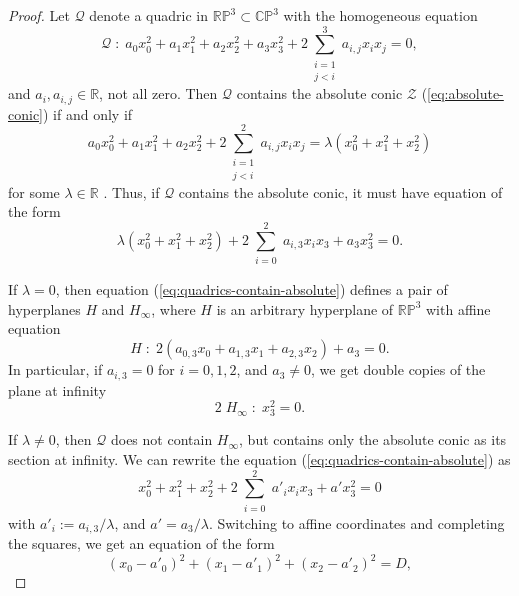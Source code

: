 \documentclass[10pt, a4paper]{article}
\theoremstyle{BoldTopSpacing}
\theoremstyle{BoldTopSpacing}
\theoremstyle{BoldTopSpacing}
\theoremstyle{BoldTopBottomSpacing}
\theoremstyle{BoldTopSpacing}
\theoremstyle{BoldTopBottomSpacing}
\theoremstyle{remark}
\begin{document}
\begin{proof}
Let $\mathcal{Q}$ denote a quadric in $\mathbb{R}\mathbb{P}^3 \subset \mathbb{C}\mathbb{P}^3$ with the homogeneous equation
\begin{equation}
    \mathcal{Q} \; : \; a_{0}x_{0}^2 + a_{1}x_{1}^2 + a_{2}x_{2}^2 + a_{3}x_{3}^2 + 2 \sum_{\substack{i = 1 \\ j < i}}^{3} a_{i, j} x_{i} x_{j} = 0,
\end{equation}
and $a_{i}, a_{i, j} \in \mathbb{R}$, not all zero. Then $\mathcal{Q}$ contains the absolute conic $\mathcal{Z}$ (\ref{eq:absolute-conic}) if and only if
\begin{equation*}
    a_{0}x_{0}^2 + a_{1}x_{1}^2 + a_{2}x_{2}^2 + 2 \sum_{\substack{i = 1 \\ j < i}}^{2} a_{i, j} x_{i} x_{j} = \lambda \left( x_{0}^2 + x_{1}^2 + x_{2}^2 \right)
\end{equation*}
for some $\lambda \in \mathbb{R}$ \cite[\textcolor{CitationColor}{Lemma~6.1.10.}]{alveroAnalyticProjectiveGeometry}. Thus, if $\mathcal{Q}$ contains the absolute conic, it must have equation of the form
\begin{equation}
\label{eq:quadrics-contain-absolute}
   \lambda \left( x_{0}^2 + x_{1}^2 + x_{2}^2 \right) + 2 \sum_{\substack{i = 0}}^{2} a_{i, 3} x_{i} x_{3} + a_{3} x_{3}^2 = 0.
\end{equation}
\par
If $\lambda = 0$, then equation (\ref{eq:quadrics-contain-absolute}) defines a pair of hyperplanes $H$ and $H_{\infty}$, where $H$ is an arbitrary hyperplane of $\mathbb{R}\mathbb{P}^3$ with affine equation
\[
    H \; : \; 2 \left( a_{0, 3} x_{0} + a_{1, 3} x_{1} + a_{2, 3} x_{2} \right) + a_{3} = 0.
\]
In particular, if $a_{i, 3} = 0$ for $i=0,1,2$, and $a_{3} \neq 0$, we get double copies of the plane at infinity
\[
    2 \; H_{\infty} \; : \; x_{3}^2 = 0.
\]
\par
If $\lambda \neq 0$, then $\mathcal{Q}$ does not contain $H_{\infty}$, but contains only the absolute conic as its section at infinity. We can rewrite the equation (\ref{eq:quadrics-contain-absolute}) as
\[
    x_{0}^2 + x_{1}^2 + x_{2}^2 + 2 \sum_{\substack{i = 0}}^{2} a'_{i} x_{i} x_{3} + a' x_{3}^2 = 0
\]
with $a'_{i} := a_{i, 3} / \lambda$, and $a' = a_{3} / \lambda$. Switching to affine coordinates and completing the squares, we get an equation of the form
\begin{equation}
\label{eq:real-or-imaginary-sphere}
(x_{0} - a'_{0})^2 + (x_{1} - a'_{1})^2  + (x_{2} - a'_{2})^2 = D,

\end{equation}
\end{proof}
\end{document}
